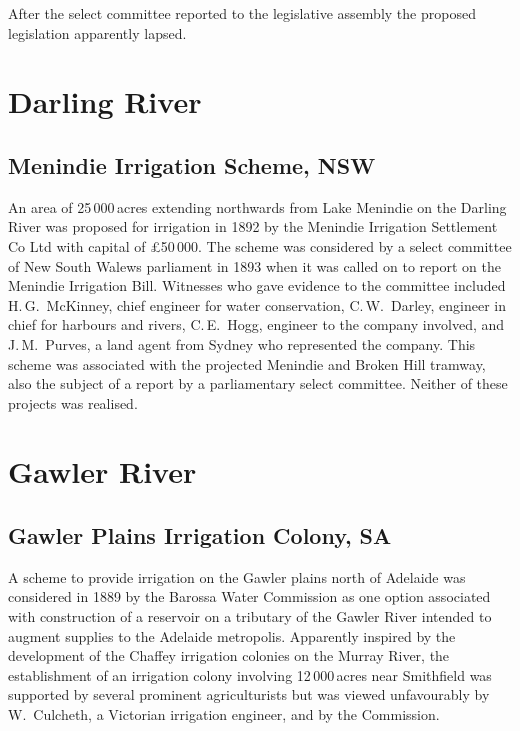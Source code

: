 After the select committee reported to the legislative assembly the
proposed legislation apparently lapsed.

\section*{Darling River}

\subsection*{Menindie Irrigation Scheme, NSW}

An area of 25\,000\,acres extending northwards from Lake Menindie on
the Darling River was proposed for irrigation in 1892 by the Menindie
Irrigation Settlement Co Ltd with capital of \pounds50\,000.  The
scheme was considered by a select committee of New South Walews
parliament in 1893 when it was called on to report on the Menindie
Irrigation Bill.  Witnesses who gave evidence to the committee
included H.\,G.~McKinney, chief engineer for water conservation,
C.\,W.~Darley, engineer in chief for harbours and rivers, C.\,E.~Hogg,
engineer to the company involved, and J.\,M.~Purves, a land agent from
Sydney who represented the company.  This scheme was associated with
the projected Menindie and Broken Hill tramway, also the subject of a
report by a parliamentary select committee.  Neither of these projects
was realised.

\section*{Gawler River}

\subsection*{Gawler Plains Irrigation Colony, SA}

A scheme to provide irrigation on the Gawler plains north of Adelaide
was considered in 1889 by the Barossa Water Commission as one option
associated with construction of a
reservoir on a tributary of the Gawler
River intended to augment supplies to the Adelaide metropolis.
Apparently inspired by the development of the Chaffey irrigation
colonies on the Murray River, the establishment of an irrigation
colony involving 12\,000\,acres near Smithfield was supported by
several prominent agriculturists but was viewed unfavourably by
W.~Culcheth, a Victorian irrigation engineer, and by the
Commission.


